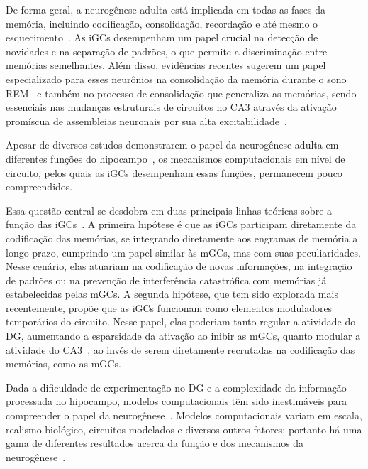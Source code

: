 De forma geral, a neurogênese adulta está implicada em todas as fases da memória, incluindo codificação, consolidação, recordação
e até mesmo o esquecimento~\cite{chavanMemory2025}. As iGCs desempenham um papel crucial na detecção de novidades e na separação
de padrões, o que permite a discriminação entre memórias semelhantes. Além disso, evidências recentes sugerem um papel
especializado para esses neurônios na consolidação da memória durante o sono REM~\cite{chavanMemory2025} e também no processo de
consolidação que generaliza as memórias, sendo essenciais nas mudanças estruturais de circuitos no CA3 através da ativação
promíscua de assembleias neuronais por sua alta excitabilidade~\cite{koSystems2025}.

Apesar de diversos estudos demonstrarem o papel da neurogênese adulta em diferentes funções do hipocampo~\cite{chavanMemory2025,
berdugo-vegaSharpening2023}, os mecanismos computacionais em nível de circuito, pelos quais as iGCs desempenham essas funções,
permanecem pouco compreendidos.

Essa questão central se desdobra em duas principais linhas teóricas sobre a função das iGCs~\cite{berdugo-vegaSharpening2023}. A
primeira hipótese é que as iGCs participam diretamente da codificação das memórias, se integrando diretamente aos engramas de
memória a longo prazo, cumprindo um papel similar às mGCs, mas com suas peculiaridades. Nesse cenário, elas atuariam na
codificação de novas informações, na integração de padrões ou na prevenção de interferência catastrófica com memórias já
estabelecidas pelas mGCs. A segunda hipótese, que tem sido explorada mais recentemente, propõe que as iGCs funcionam como
elementos moduladores temporários do circuito. Nesse papel, elas poderiam tanto regular a atividade do DG, aumentando a
esparsidade da ativação ao inibir as mGCs, quanto modular a atividade do CA3~\cite{aimoneComputational2016,
berdugo-vegaSharpening2023}, ao invés de serem diretamente recrutadas na codificação das memórias, como as mGCs.

Dada a dificuldade de experimentação no DG e a complexidade da informação processada no hipocampo, modelos computacionais têm sido
inestimáveis para compreender o papel da neurogênese~\cite{aimoneComputational2016}. Modelos computacionais variam em escala,
realismo biológico, circuitos modelados e diversos outros fatores; portanto há uma gama de diferentes resultados acerca da função
e dos mecanismos da neurogênese~\cite{aimoneComputational2016, berdugo-vegaSharpening2023}.

